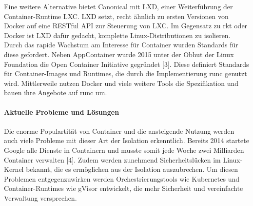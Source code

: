 \begin{multicols}{2}
Eine weitere Alternative bietet Canonical mit LXD, einer Weiterführung der Container-Runtime LXC. LXD setzt, recht ähnlich zu ersten Versionen von Docker auf eine RESTful API zur Steuerung von LXC. Im Gegensatz zu rkt oder Docker ist LXD dafür gedacht, komplette Linux-Distributionen zu isolieren.
Durch das rapide Wachstum am Interesse für Container wurden Standards für diese gefordert. Neben AppContainer wurde 2015 unter der Obhut der Linux Foundation die Open Container Initiative gegründet [3]. Diese definiert Standards für Container-Images und Runtimes, die durch die Implementierung runc genutzt wird. Mittlerweile nutzen Docker und viele weitere Tools die Spezifikation und bauen ihre Angebote auf runc um.
\\
\\ \textbf{Aktuelle Probleme und Lösungen}
\\
\\
Die enorme Populartität von Container und die ansteigende Nutzung werden auch viele Probleme mit dieser Art der Isolation erkenntlich. Bereits 2014 startete Google alle Dienste in Containern und musste somit jede Woche zwei Milliarden Container verwalten [4]. Zudem werden zunehmend Sicherheitslücken im Linux-Kernel bekannt, die es ermöglichen aus der Isolation auszubrechen. Um diesen Problemen entgegenzuwirken werden Orchestrierungstools wie Kubernetes und Container-Runtimes wie gVisor entwickelt, die mehr Sicherheit und vereinfachte Verwaltung versprechen.


\end{multicols}
\def\footnoterule{}
